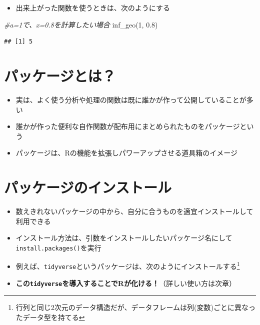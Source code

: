 \documentclass[
]{book}
\newenvironment{Shaded}{\begin{snugshade}}{\end{snugshade}}
\newcommand{\CommentTok}[1]{\textcolor[rgb]{0.56,0.35,0.01}{\textit{#1}}}
\newcommand{\DecValTok}[1]{\textcolor[rgb]{0.00,0.00,0.81}{#1}}
\newcommand{\FloatTok}[1]{\textcolor[rgb]{0.00,0.00,0.81}{#1}}
\newcommand{\FunctionTok}[1]{\textcolor[rgb]{0.00,0.00,0.00}{#1}}
\newcommand{\NormalTok}[1]{#1}
\providecommand{\tightlist}{%
  \setlength{\itemsep}{0pt}\setlength{\parskip}{0pt}}
\begin{document}
\begin{itemize}
\tightlist
\item
  出来上がった関数を使うときは、次のようにする
\end{itemize}

\begin{Shaded}
\begin{Highlighting}[]
\CommentTok{\#a=1で、x=0.8を計算したい場合}
\FunctionTok{inf\_geo}\NormalTok{(}\DecValTok{1}\NormalTok{, }\FloatTok{0.8}\NormalTok{)}
\end{Highlighting}
\end{Shaded}

\begin{verbatim}
## [1] 5
\end{verbatim}

\hypertarget{ux30d1ux30c3ux30b1ux30fcux30b8ux3068ux306f}{%
\section{パッケージとは？}\label{ux30d1ux30c3ux30b1ux30fcux30b8ux3068ux306f}}

\begin{itemize}
\tightlist
\item
  実は、よく使う分析や処理の関数は既に誰かが作って公開していることが多い
\item
  誰かが作った便利な自作関数が配布用にまとめられたものをパッケージという
\item
  パッケージは、Rの機能を拡張しパワーアップさせる道具箱のイメージ
\end{itemize}

\hypertarget{ux30d1ux30c3ux30b1ux30fcux30b8ux306eux30a4ux30f3ux30b9ux30c8ux30fcux30eb}{%
\section{パッケージのインストール}\label{ux30d1ux30c3ux30b1ux30fcux30b8ux306eux30a4ux30f3ux30b9ux30c8ux30fcux30eb}}

\begin{itemize}
\tightlist
\item
  数えきれないパッケージの中から、自分に合うものを適宜インストールして利用できる
\item
  インストール方法は、引数をインストールしたいパッケージ名にして\texttt{install.packages()}を実行
\item
  例えば、\texttt{tidyverse}というパッケージは、次のようにインストールする\footnote{行列と同じ2次元のデータ構造だが、データフレームは列(変数)ごとに異なったデータ型を持てる}
\item
  \textbf{この\texttt{tidyverse}を導入することでRが化ける！}（詳しい使い方は次章）
\end{itemize}
\end{document}
